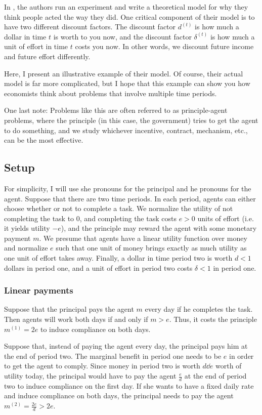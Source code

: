 In \citet{timestuff}, the authors run an experiment and write a theoretical model for why they think people acted the way they did. One critical component of their model is to have two different discount factors. The discount factor $d^{(t)}$ is how much a dollar in time $t$ is worth to you now, and the discount factor $\delta^{(t)}$ is how much a unit of effort in time $t$ costs you now. In other words, we discount future income and future effort differently. 

Here, I present an illustrative example of their model. Of course, their actual model is far more complicated, but I hope that this example can show you how economists think about problems that involve multiple time periods. 

One last note: Problems like this are often referred to as principle-agent problems, where the principle (in this case, the government) tries to get the agent to do something, and we study whichever incentive, contract, mechanism, etc., can be the most effective. 

\subsection*{Setup}
For simplicity, I will use she pronouns for the principal and he pronouns for the agent. Suppose that there are two time periods. In each period, agents can either choose whether or not to complete a task. We normalize the utility of not completing the task to $0$, and completing the task costs $e > 0$ units of effort (i.e. it yields utility $-e$), and the principle may reward the agent with some monetary payment $m$. We presume that agents have a linear utility function over money and normalize $e$ such that one unit of money brings exactly as much utility as one unit of effort takes away. Finally, a dollar in time period two is worth $d < 1$ dollars in period one, and a unit of effort in period two costs $\delta < 1$ in period one.
\subsubsection*{Linear payments}
Suppose that the principal pays the agent $m$ every day if he completes the task. Then agents will work both days if and only if $m > e$. Thus, it costs the principle $m^{(1)} = 2e$ to induce compliance on both days.

Suppose that, instead of paying the agent every day, the principal pays him at the end of period two. The marginal benefit in period one needs to be $e$ in order to get the agent to comply. Since money in period two is worth $d \dd e$ worth of utility today, the principal would have to pay the agent $\frac{e}{d}$ at the end of period two to induce compliance on the first day. If she wants to have a fixed daily rate and induce compliance on both days, the principal needs to pay the agent $m^{(2)} =\frac{2e}{d} > 2e$. 

